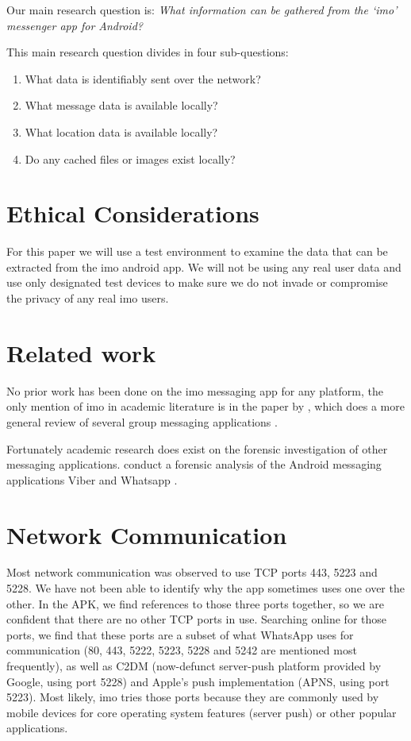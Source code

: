\documentclass[conference]{IEEEtran}
\begin{document}
Our main research question is:
{\it What information can be gathered from the `imo' messenger app for Android?}

This main research question divides in four sub-questions:

\begin{enumerate}
    \item What data is identifiably sent over the network?
    \item What message data is available locally?
    \item What location data is available locally?
    \item Do any cached files or images exist locally?
\end{enumerate}


\section{Ethical Considerations}\label{sec:ethics}

For this paper we will use a test environment to examine the data that can be
extracted from the imo android app. We will not be using any real user data and
use only designated test devices to make sure we do not invade or compromise the
privacy of any real imo users.


\section{Related work}\label{sec:relwork}

No prior work has been done on the imo messaging app for any platform, the only
mention of imo in academic literature is in the paper by \citeauthor{zhu}, which
does a more general review of several group messaging applications \cite{zhu}.

Fortunately academic research does exist on the forensic investigation of other
messaging applications. \citeauthor{mahajan2013forensic} conduct a forensic
analysis of the Android messaging applications Viber and Whatsapp
\cite{mahajan2013forensic}. %


\section{Network Communication}\label{sec:comm}

Most network communication was observed to use TCP ports 443, 5223 and 5228. We
have not been able to identify why the app sometimes uses one over the other.
In the APK, we find references to those three ports together, so we are
confident that there are no other TCP ports in use. Searching online for those
ports, we find that these ports are a subset of what WhatsApp uses for
communication (80, 443, 5222, 5223, 5228 and 5242 are mentioned most
frequently), as well as C2DM (now-defunct server-push platform provided by
Google, using port 5228) and Apple's push implementation (APNS, using port
5223). Most likely, imo tries those ports because they are commonly used by
mobile devices for core operating system features (server push) or other
popular applications.
\end{document}
